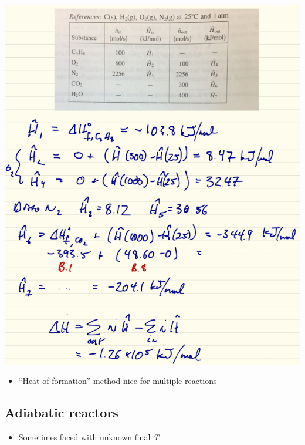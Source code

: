 \documentclass[11pt]{article}
\begin{document}
\includegraphics[width=.9\linewidth]{./figs/RxnEnthalpy2.png}

\begin{itemize}
\item ``Heat of formation'' method nice for multiple reactions
\end{itemize}

\subsection{Adiabatic reactors}
\label{sec-11-4}

\begin{itemize}
\item Sometimes faced with unknown final \emph{T}
\end{itemize}
\end{document}
